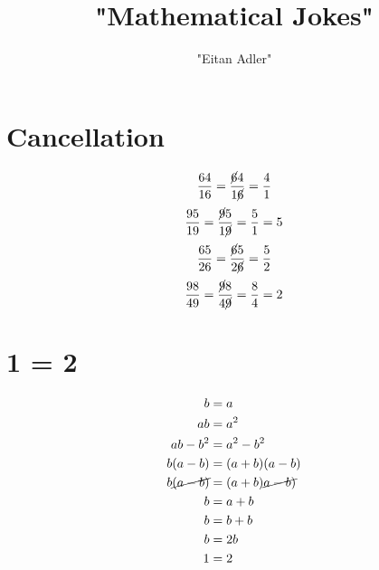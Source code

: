 \documentclass{article}
\title {"Mathematical Jokes"}
\author {"Eitan Adler"}
\begin{document}
\maketitle

\section{Cancellation}
\begin{equation}
	\begin{split}
		\frac{64}{16}
		=
		\frac{\cancel{6}4}{1\cancel{6}}
		=
		\frac{4}{1}
	\end{split}
\end{equation}
\begin{equation}
	\begin{split}
		\frac{95}{19}
		=
		\frac{\cancel{9}5}{1\cancel{9}}
		=
		\frac{5}{1}
		=
		5
	\end{split}
\end{equation}
\begin{equation}
	\begin{split}
		\frac{65}{26}
		=
		\frac{\cancel{6}5}{2\cancel{6}}
		=
		\frac{5}{2}
	\end{split}
\end{equation}
\begin{equation}
	\begin{split}
		\frac{98}{49}
		=
		\frac{\cancel{9}8}{4\cancel{9}}
		=
		\frac{8}{4}
		=
		2
	\end{split}
\end{equation}

\section{1 = 2}

\begin{equation}
	\begin{split}
		b        &= a \\
		ab       &= a^2 \\
		ab - b^2 &= a^2 - b^2 \\
		b(a - b) &= (a + b)(a - b) \\
		b\cancel{(a - b)} &= (a + b)\cancel{a - b)} \\
		b        &= a + b \\
		b        &= b + b \\
		b        &= 2b \\
		1        &= 2
	\end{split}
\end{equation}
\end{document}
